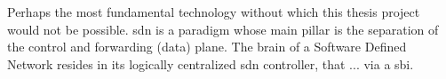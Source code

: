 Perhaps the most fundamental technology without which this thesis project would not be possible.
\gls{sdn} is a paradigm whose main pillar is the separation of the control and forwarding (data) plane.
The brain of a Software Defined Network resides in its logically centralized \gls{sdn} controller, that ... via a \gls{sbi}.
